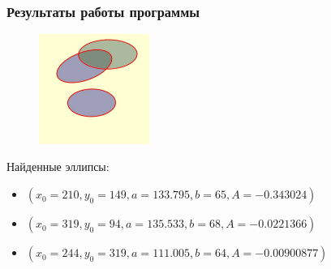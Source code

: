 \documentclass[14pt]{beamer}
\begin{document}

\begin{frame}
\frametitle{Результаты работы программы}
\begin{figure} 
\vspace{-3ex}
\includegraphics[width=0.32\textwidth,left]{res}
\label{fig:res}
\end{figure}
Найденные эллипсы:
\small
\begin{itemize}
  \item $(x_0 = 210, y_0 = 149, a = 133.795, b = 65, A = -0.343024)$
  \item $(x_0 = 319, y_0 = 94, a = 135.533, b = 68, A = -0.0221366)$
  \item $(x_0 = 244, y_0 = 319, a = 111.005, b = 64, A = -0.00900877)$
\end{itemize}
\normalsize
\end{frame}
\end{document}

